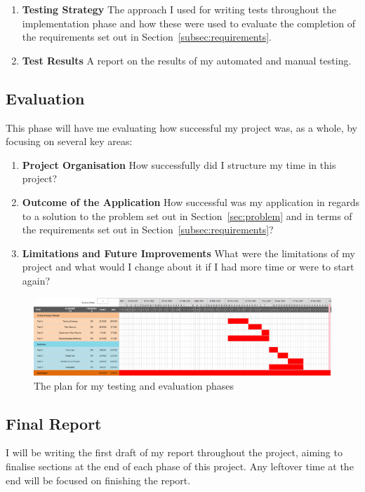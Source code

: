 \begin{enumerate}
  \item \textbf{Testing Strategy} The approach I used for writing tests throughout the implementation phase and how these were used to evaluate the completion of the requirements set out in Section~\ref{subsec:requirements}. 
  \item \textbf{Test Results} A report on the results of my automated and manual testing.
\end{enumerate}

\subsection*{Evaluation}
This phase will have me evaluating how successful my project was, as a whole, by focusing on several key areas:

\begin{enumerate}
  \item \textbf{Project Organisation} How successfully did I structure my time in this project?
  \item \textbf{Outcome of the Application} How successful was my application in regards to a solution to the problem set out in Section~\ref{sec:problem} and in terms of the requirements set out in Section~\ref{subsec:requirements}?
  \item \textbf{Limitations and Future Improvements} What were the limitations of my project and what would I change about it if I had more time or were to start again?
\end{enumerate}

\begin{figure}[H]
  \centering
  \includegraphics[width=\textwidth]{assets/images/charts/gantt/testing-evaluation.png}
  \caption{The plan for my testing and evaluation phases}
  \label{fig:final-gantt}
\end{figure}

\subsection*{Final Report}

I will be writing the first draft of my report throughout the project, aiming to finalise sections at the end of each phase of this project. Any leftover time at the end will be focused on finishing the report.
